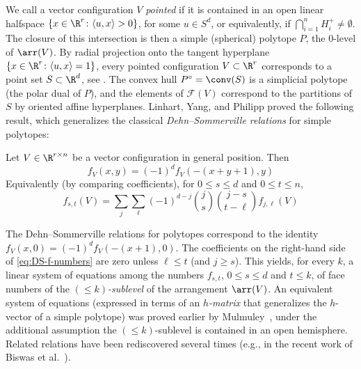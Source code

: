 %
We call a vector configuration $V$ \emph{pointed} if it is contained in an open linear halfspace $\{x\in \R^r\colon \langle u,x\rangle >0\}$, for some $u\in S^d$, or equivalently, if %
$\bigcap_{i=1}^n H^+_i\neq \emptyset$. %
The closure of this intersection is then a simple (spherical) polytope $P$, the $0$-level of $\arr(V)$.
By radial projection onto the tangent hyperplane $\{x\in \R^r\colon \langle u,x\rangle = 1\}$, every pointed configuration $V\subset \R^r$ corresponds to a point set $S\subset \R^d$, see \cite[Sec.~5.6]{Matousek:2002aa}. %
The convex hull $P^\circ=\conv(S)$ is a simplicial polytope (the polar dual of $P$), and the elements of $\mathcal{F}(V)$ correspond to the partitions of $S$ by oriented affine hyperplanes. 
%
%
Linhart, Yang, and Philipp \cite{Linhart:2000aa} proved the following result, which generalizes the classical \emph{Dehn--Sommerville relations} for simple polytopes:
\begin{theorem}
\label{thm:DS-levels}
Let $V \in \R^{r\times n}$ be a vector configuration in general position. Then
\begin{equation}
\label{eq:DS-f-poly}
f_V(x,y)=(-1)^d f_V(-(x+y+1),y)
\end{equation}
Equivalently (by comparing coefficients), for $0\leq s\leq d$ and $0\leq t\leq n$,
\begin{equation}
\label{eq:DS-f-numbers}
f_{s,t}(V)=\sum_{j} \sum_{\ell} (-1)^{d-j} \binom{j}{s} \binom{j-s}{t-\ell} f_{j,\ell}(V) 
\end{equation}
\end{theorem}
\begin{remark}
The Dehn--Sommerville relations for polytopes correspond to the identity $f_V(x,0)=(-1)^d f_V(-(x+1),0)$. The coefficients on the right-hand side of \eqref{eq:DS-f-numbers} are zero unless $\ell \leq t$ (and $j\geq s$). This yields, for every $k$, a linear system of equations among the numbers $f_{s,t}$, $0\leq s\leq d$ and $t\leq k$, of face numbers of the  \emph{$(\leq k)$-sublevel} of the arrangement $\arr(V)$. An equivalent system of equations (expressed in terms of an \emph{$h$-matrix} that generalizes the $h$-vector of a simple polytope) was proved earlier by Mulmuley~\cite{Mulmuley:1993aa}, under the additional assumption the $(\leq k)$-sublevel is contained in an open hemisphere. %
Related relations have been rediscovered several times (e.g., in the recent work of Biswas et al.~\cite{Biswas:2024aa}).
\end{remark}
